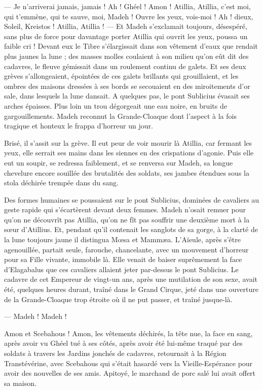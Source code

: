 \documentclass[a4paper, 11pt, oneside, polutonikogreek, french]{article}
\begin{document}
--- Je n'arriverai jamais, jamais ! Ah ! Ghéel ! Amon ! Atillia, Atillia, c'est moi, qui t'emmène, qui te sauve, moi, Madeh ! Ouvre les yeux, vois-moi ! Ah ! dieux, Soleil, Kreistos ! Atillia, Atillia ! --- Et Madeh s'exclamait toujours, désespéré, sans plus de force pour davantage porter Atillia qui ouvrit les yeux, poussa un faible cri ! Devant eux le Tibre s'élargissait dans son vêtement d'eaux que rendait plus jaunes la lune ; des masses molles coulaient à son milieu qu'on eût dit des cadavres, le fleuve gémissait dans un roulement continu de galets. Et ses deux grèves s'allongeaient, épointées de ces galets brillants qui grouillaient, et les ombres des maisons dressées à ses bords se secouaient en des miroitements d'or sale, dans lesquels la lune dansait. A quelques pas, le pont Sublicius évasait ses arches épaisses. Plus loin un trou dégorgeait une eau noire, en bruits de gargouillements. Madeh reconnut la Grande-Cloaque dont l'aspect à la fois tragique et honteux le frappa d'horreur un jour.

Brisé, il s'assit sur la grève. Il eut peur de voir mourir là Atillia, car fermant les yeux, elle serrait ses mains dans les siennes en des crispations d'agonie. Puis elle eut un soupir, se redressa faiblement, et se renversa sur Madeh, sa longue chevelure encore souillée des brutalités des soldats, ses jambes étendues sous la stola déchirée trempée dans du sang.

Des formes humaines se poussaient sur le pont Sublicius, dominées de cavaliers au geste rapide qui s'écartèrent devant deux femmes. Madeh n'osait remuer pour qu'on ne découvrît pas Atillia, qu'on ne fît pas souffrir une deuxième mort à la sœur d'Atillius. Et, pendant qu'il contenait les sanglots de sa gorge, à la clarté de la lune toujours jaune il distingua Mœsa et Mammæa. L'Aïeule, après s'être agenouillée, partait seule, farouche, chancelante, avec un mouvement d'horreur pour sa Fille vivante, immobile là. Elle venait de baiser suprêmement la face d'Elagabalus que ces cavaliers allaient jeter par-dessus le pont Sublicius. Le cadavre de cet Empereur de vingt-un ans, après une mutilation de son sexe, avait été, quelques heures durant, traîné dans le Grand Cirque, jeté dans une ouverture de la Grande-Cloaque trop étroite où il ne put passer, et traîné jusque-là.

--- Madeh ! Madeh !

Amon et Scebahous ! Amon, les vêtements déchirés, la tête nue, la face en sang, après avoir vu Ghéel tué à ses côtés, après avoir été lui-même traqué par des soldats à travers les Jardins jonchés de cadavres, retournait à la Région Transtévérine, avec Scebahous qui s'était hasardé vers la Vieille-Espérance pour avoir des nouvelles de ses amis. Apitoyé, le marchand de porc salé lui avait offert sa maison.
\end{document}
